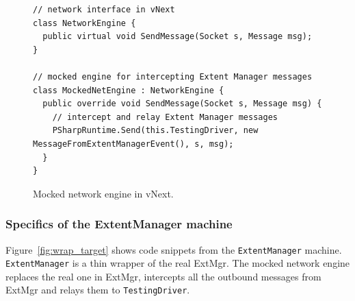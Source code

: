 \begin{figure}[t]
\begin{lstlisting}
// network interface in vNext
class NetworkEngine {
  public virtual void SendMessage(Socket s, Message msg);
}

// mocked engine for intercepting Extent Manager messages
class MockedNetEngine : NetworkEngine {
  public override void SendMessage(Socket s, Message msg) {
    // intercept and relay Extent Manager messages
    PSharpRuntime.Send(this.TestingDriver, new MessageFromExtentManagerEvent(), s, msg);
  }
}
\end{lstlisting}
\vspace{-2mm}
\caption{Mocked network engine in vNext.}
\label{fig:enginecode}
\end{figure}



\subsubsection{Specifics of the ExtentManager machine}

Figure~\ref{fig:wrap_target} shows code snippets from the \texttt{ExtentManager} \psharp machine. \texttt{ExtentManager} is a thin wrapper of the real ExtMgr. The mocked network engine replaces the real one in ExtMgr, intercepts all the outbound messages from ExtMgr and relays them to \texttt{TestingDriver}.

